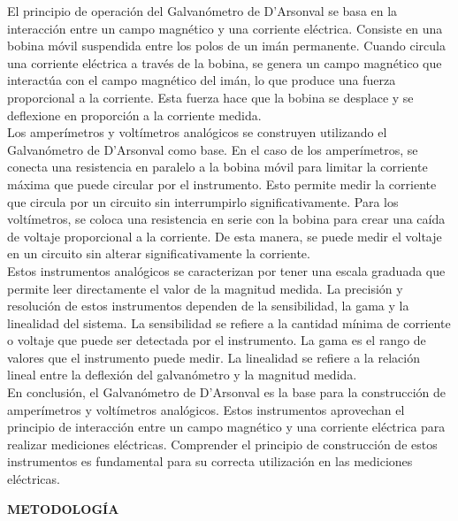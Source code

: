 \documentclass[12pt]{article}
\begin{document}
	El principio de operación del Galvanómetro de D'Arsonval se basa en la interacción entre un campo magnético y una corriente eléctrica. Consiste en una bobina móvil suspendida entre los polos de un imán permanente. Cuando circula una corriente eléctrica a través de la bobina, se genera un campo magnético que interactúa con el campo magnético del imán, lo que produce una fuerza proporcional a la corriente. Esta fuerza hace que la bobina se desplace y se deflexione en proporción a la corriente medida.\\
	
	Los amperímetros y voltímetros analógicos se construyen utilizando el Galvanómetro de D'Arsonval como base. En el caso de los amperímetros, se conecta una resistencia en paralelo a la bobina móvil para limitar la corriente máxima que puede circular por el instrumento. Esto permite medir la corriente que circula por un circuito sin interrumpirlo significativamente. Para los voltímetros, se coloca una resistencia en serie con la bobina para crear una caída de voltaje proporcional a la corriente. De esta manera, se puede medir el voltaje en un circuito sin alterar significativamente la corriente.\\
	
	Estos instrumentos analógicos se caracterizan por tener una escala graduada que permite leer directamente el valor de la magnitud medida. La precisión y resolución de estos instrumentos dependen de la sensibilidad, la gama y la linealidad del sistema. La sensibilidad se refiere a la cantidad mínima de corriente o voltaje que puede ser detectada por el instrumento. La gama es el rango de valores que el instrumento puede medir. La linealidad se refiere a la relación lineal entre la deflexión del galvanómetro y la magnitud medida.\\
	
	En conclusión, el Galvanómetro de D'Arsonval es la base para la construcción de amperímetros y voltímetros analógicos. Estos instrumentos aprovechan el principio de interacción entre un campo magnético y una corriente eléctrica para realizar mediciones eléctricas. Comprender el principio de construcción de estos instrumentos es fundamental para su correcta utilización en las mediciones eléctricas.\\
	
	\newpage
	
	\begin{center}
		\textbf{\large METODOLOGÍA}\\
	\end{center}
\end{document}
